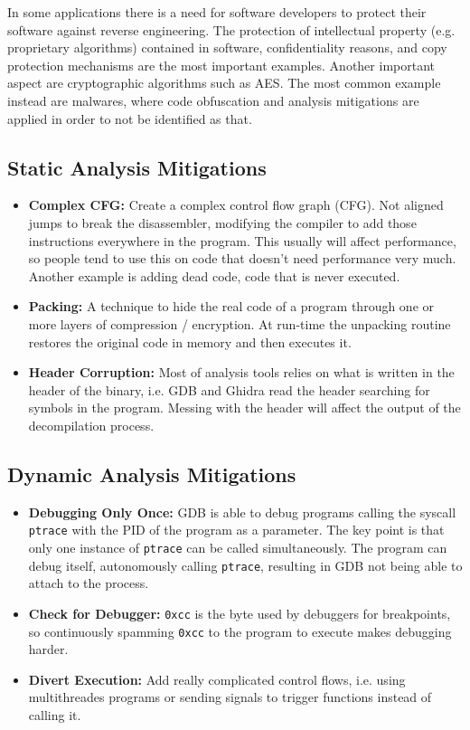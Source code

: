 \documentclass{article}
\begin{document}
In some applications there is a need for software developers to protect their software against reverse engineering. 
The protection of intellectual property (e.g. proprietary algorithms) contained in software, confidentiality reasons, 
and copy protection mechanisms are the most important examples. Another important aspect are cryptographic algorithms 
such as AES. \citep{codeobf} The most common example instead are malwares, where code obfuscation and analysis
mitigations are applied in order to not be identified as that.

\subsection{Static Analysis Mitigations}

\begin{itemize}
\item{\textbf{Complex CFG:}} Create a complex control flow graph (CFG). Not aligned jumps to break the disassembler, 
modifying the compiler to add those instructions everywhere in the program. This usually will affect 
performance, so people tend to use this on code that doesn’t need performance very much. Another example is adding 
dead code, code that is never executed.
\item{\textbf{Packing:}} A technique to hide the real code of a program through one or more layers of compression / 
encryption. At run-time the unpacking routine restores the original code in memory and then executes it.
\item{\textbf{Header Corruption:}} Most of analysis tools relies on what is written in the header of the binary,
i.e. GDB and Ghidra read the header searching for symbols in the program. Messing with the header will affect the
output of the decompilation process.
\end{itemize}

\subsection{Dynamic Analysis Mitigations}

\begin{itemize}
\item{\textbf{Debugging Only Once:}} GDB is able to debug programs calling the syscall \texttt{ptrace} with the PID of
the program as a parameter. The key point is that only one instance of \texttt{ptrace} can be called simultaneously. 
The program can debug itself, autonomously calling \texttt{ptrace}, resulting in GDB not being able to attach to 
the process.
\item{\textbf{Check for Debugger:}} \texttt{0xcc} is the byte used by debuggers for breakpoints, so continuously
spamming \texttt{0xcc} to the program to execute makes debugging harder.
\item{\textbf{Divert Execution:}} Add really complicated control flows, i.e. using multithreades programs or 
sending signals to trigger functions instead of calling it.
\end{itemize}
\end{document}

